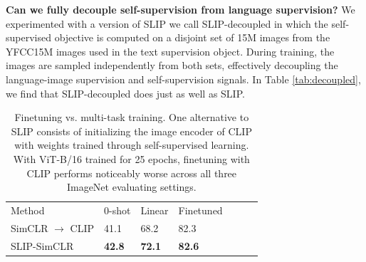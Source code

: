 \documentclass[10pt,twocolumn,letterpaper]{article}
\newcommand{\tablestyle}[2]{\setlength{\tabcolsep}{#1}\renewcommand{\arraystretch}{#2}\centering\footnotesize}
\renewcommand{\paragraph}[1]{\vspace{1.25mm}\noindent\textbf{#1}}
\begin{document}
\paragraph{Can we fully decouple self-supervision from language supervision?}
We experimented with a version of SLIP we call SLIP-decoupled in which the self-supervised objective is computed on a disjoint set of 15M images from the YFCC15M images used in the text supervision object.
During training, the images are sampled independently from both sets, effectively decoupling the language-image supervision and self-supervision signals.
In Table \ref{tab:decoupled}, we find that SLIP-decoupled does just as well as SLIP.

\begin{table}[ht]
\tablestyle{2pt}{1.1}
\begin{tabular}{l l l l c c c}
Method & 0-shot & Linear & Finetuned \\
\shline
SimCLR $\rightarrow$ CLIP & 41.1 & 68.2 & 82.3 \\
SLIP-SimCLR & \textbf{42.8} & \textbf{72.1} & \textbf{82.6} \\
\end{tabular}
\vspace{-.5em}
\caption{Finetuning vs. multi-task training.
One alternative to SLIP consists of initializing the image encoder of CLIP with weights trained through self-supervised learning.
With ViT-B/16 trained for 25 epochs, finetuning with CLIP performs noticeably worse across all three ImageNet evaluating settings.
}
\label{tab:finetune-or-multitask}
\vspace{-.5em}
\end{table}
\end{document}
